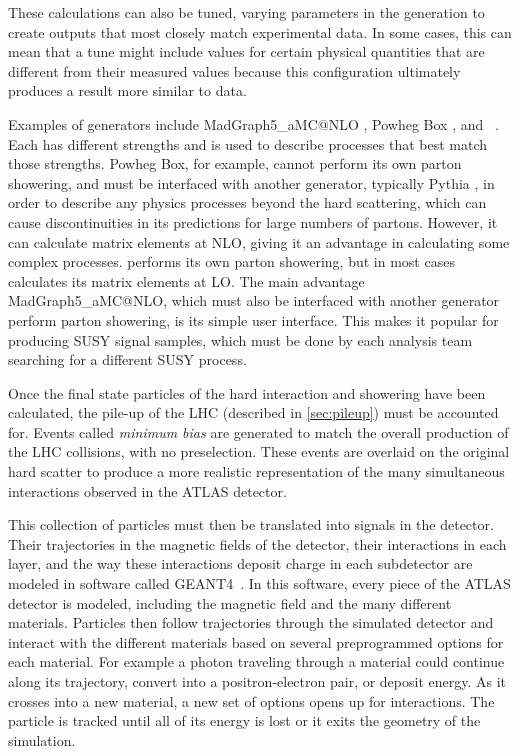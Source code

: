 These calculations can also be tuned, varying parameters in the generation to create outputs that most closely match experimental data. In some cases, this can mean that a tune might include values for certain physical quantities that are different from their measured values because this configuration ultimately produces a result more similar to data. 

Examples of generators include {\sc MadGraph5\_aMC@NLO} \cite{Alwall:2014hca}, {\sc Powheg Box} \cite{PowhegBOX1,PowhegBOX2,PowhegBOX3}, and \sherpa~\cite{sherpa}. Each has different strengths and is used to describe processes that best match those strengths. {\sc Powheg Box}, for example, cannot perform its own parton showering, and must be interfaced with another generator, typically {\sc Pythia} \cite{Sjostrand:2006za}, in order to describe any physics processes beyond the hard scattering, which can cause discontinuities in its predictions for large numbers of partons. However, it can calculate matrix elements at \ac{NLO}, giving it an advantage in calculating some complex processes. \sherpa performs its own parton showering, but in most cases calculates its matrix elements at \ac{LO}. The main advantage {\sc MadGraph5\_aMC@NLO}, which must also be interfaced with another generator perform parton showering, is its simple user interface. This makes it popular for producing \ac{SUSY} signal samples, which must be done by each analysis team searching for a different \ac{SUSY} process. 

Once the final state particles of the hard interaction and showering have been calculated, the pile-up of the \ac{LHC} (described in \autoref{sec:pileup}) must be accounted for. Events called \textit{minimum bias} are generated to match the overall production of the \ac{LHC} collisions, with no preselection. These events are overlaid on the original hard scatter to produce a more realistic representation of the many simultaneous interactions observed in the ATLAS detector.

This collection of particles must then be translated into signals in the detector. Their trajectories in the magnetic fields of the detector, their interactions in each layer, and the way these interactions deposit charge in each subdetector are modeled in software called {\sc GEANT4}~\cite{Agostinelli:2002hh}. In this software, every piece of the ATLAS detector is modeled, including the magnetic field and the many different materials. Particles then follow trajectories through the simulated detector and interact with the different materials based on several preprogrammed options for each material. For example a photon traveling through a material could continue along its trajectory, convert into a positron-electron pair, or deposit energy. As it crosses into a new material, a new set of options opens up for interactions. The particle is tracked until all of its energy is lost or it exits the geometry of the simulation.

